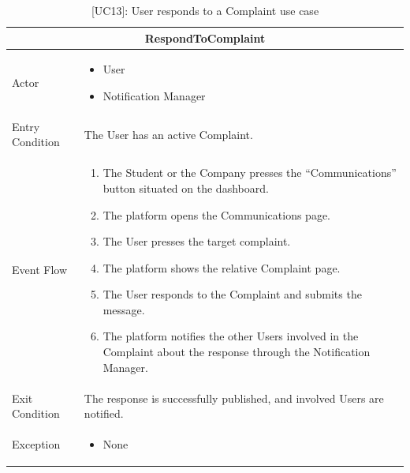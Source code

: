 \begin{table}[H]
    \centering
    \begin{tabular}{|p{3cm}|p{12cm}|}
    \hline
    \multicolumn{2}{|c|}{\textbf{RespondToComplaint}} \\ \hline
    Actor & 
    \begin{itemize}
        \item User
        \item Notification Manager
    \end{itemize} \\ \hline
    Entry Condition & The User has an active Complaint.\\ \hline
    Event Flow &      
    \begin{enumerate}         
        \item The Student or the Company presses the “Communications” button situated on the dashboard.
        \item The platform opens the Communications page.
        \item The User presses the target complaint.
        \item The platform shows the relative Complaint page.
        \item The User responds to the Complaint and submits the message.
        \item The platform notifies the other Users involved in the Complaint about the response through the Notification Manager.
    \end{enumerate} \\ \hline
    Exit Condition & The response is successfully published, and involved Users are notified.\\ \hline
    Exception & 
    \begin{itemize}       
        \item None
    \end{itemize} \\ \hline
    \end{tabular}
    \caption{[UC13]: User responds to a Complaint use case}
    \label{tab:UC13}
\end{table}


